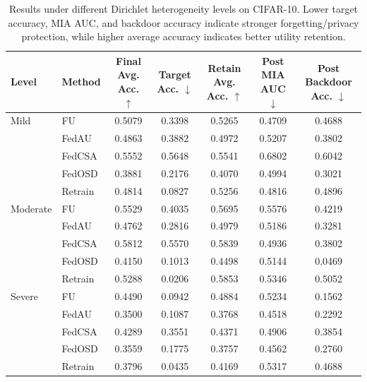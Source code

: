 \begin{table}[t]
\centering
\caption{Results under different Dirichlet heterogeneity levels on CIFAR-10. Lower target accuracy, MIA AUC, and backdoor accuracy indicate stronger forgetting/privacy protection, while higher average accuracy indicates better utility retention.}
\label{tab:heterogeneity_results}
\begin{tabular}{llccccc}
\toprule
Level & Method & Final Avg. Acc. $\uparrow$ & Target Acc. $\downarrow$ & Retain Avg. Acc. $\uparrow$ & Post MIA AUC $\downarrow$ & Post Backdoor Acc. $\downarrow$ \\
\midrule
Mild & FU & 0.5079 & 0.3398 & 0.5265 & 0.4709 & 0.4688 \\
 & FedAU & 0.4863 & 0.3882 & 0.4972 & 0.5207 & 0.3802 \\
 & FedCSA & 0.5552 & 0.5648 & 0.5541 & 0.6802 & 0.6042 \\
 & FedOSD & 0.3881 & 0.2176 & 0.4070 & 0.4994 & 0.3021 \\
 & Retrain & 0.4814 & 0.0827 & 0.5256 & 0.4816 & 0.4896 \\
\midrule
Moderate & FU & 0.5529 & 0.4035 & 0.5695 & 0.5576 & 0.4219 \\
 & FedAU & 0.4762 & 0.2816 & 0.4979 & 0.5186 & 0.3281 \\
 & FedCSA & 0.5812 & 0.5570 & 0.5839 & 0.4936 & 0.3802 \\
 & FedOSD & 0.4150 & 0.1013 & 0.4498 & 0.5144 & 0.0469 \\
 & Retrain & 0.5288 & 0.0206 & 0.5853 & 0.5346 & 0.5052 \\
\midrule
Severe & FU & 0.4490 & 0.0942 & 0.4884 & 0.5234 & 0.1562 \\
 & FedAU & 0.3500 & 0.1087 & 0.3768 & 0.4518 & 0.2292 \\
 & FedCSA & 0.4289 & 0.3551 & 0.4371 & 0.4906 & 0.3854 \\
 & FedOSD & 0.3559 & 0.1775 & 0.3757 & 0.4562 & 0.2760 \\
 & Retrain & 0.3796 & 0.0435 & 0.4169 & 0.5317 & 0.4688 \\
\bottomrule
\end{tabular}
\end{table}
